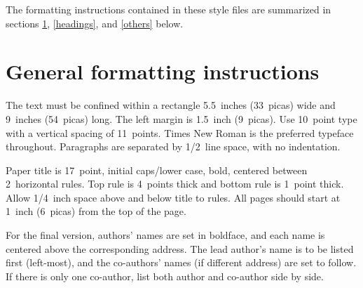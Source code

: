 \documentclass{article} %
\begin{document}
The formatting instructions contained in these style files are summarized in
sections \ref{gen_inst}, \ref{headings}, and \ref{others} below.




\section{General formatting instructions}
\label{gen_inst}

The text must be confined within a rectangle 5.5~inches (33~picas) wide and
9~inches (54~picas) long. The left margin is 1.5~inch (9~picas).
Use 10~point type with a vertical spacing of 11~points. Times New Roman is the
preferred typeface throughout. Paragraphs are separated by 1/2~line space,
with no indentation.

Paper title is 17~point, initial caps/lower case, bold, centered between
2~horizontal rules. Top rule is 4~points thick and bottom rule is 1~point
thick. Allow 1/4~inch space above and below title to rules. All pages should
start at 1~inch (6~picas) from the top of the page.


For the final version, authors' names are
set in boldface, and each name is centered above the corresponding
address. The lead author's name is to be listed first (left-most), and
the co-authors' names (if different address) are set to follow. If
there is only one co-author, list both author and co-author side by side.
\end{document}
